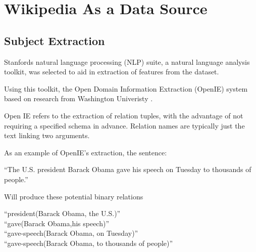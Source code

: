 \documentclass[12pt]{report}
\begin{document}


\chapter{Wikipedia As a Data Source}

        \section{Subject Extraction}
        Stanfords natural language processing (NLP) suite,
        a natural language analysis toolkit,
        was selected to aid in extraction of features from the dataset.

        Using this toolkit, the Open Domain Information Extraction (OpenIE) system
        based on research from Washington Univeristy \cite{angeli2015leveraging}.

        Open IE refers to the extraction of relation tuples, with the advantage of not requiring a
        specified schema in advance. Relation names are typically just the text linking two arguments.

        As an example of OpenIE's extraction, the sentence:\\
        \begin{center}
        ``The U.S. president Barack Obama gave his speech on Tuesday to thousands of people.''\\
        \end{center}
        Will produce these potential binary relations
        \begin{center}
        ``president(Barack Obama, the U.S.)''\\
        ``gave(Barack Obama,his speech)''\\
        ``gave-speech(Barack Obama, on Tuesday)''\\
        ``gave-speech(Barack Obama, to thousands of people)''\\
        \end{center}
\end{document}
